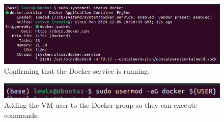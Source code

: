 \documentclass[12pt]{report}
\begin{document}
\begin{figure}[H]
    \centering
    \includegraphics[width=\linewidth]{Implementation/Docker/Installation/6.png}
    \caption{Confirming that the Docker service is running.}
    \label{fig:DockerInstall6}
\end{figure}

\begin{figure}[H]
    \centering
    \includegraphics[width=\linewidth]{Implementation/Docker/Installation/7.png}
    \caption{Adding the VM user to the Docker group so they can execute commands.}
    \label{fig:DockerInstall7}
\end{figure}


\printbibliography
\end{document}
